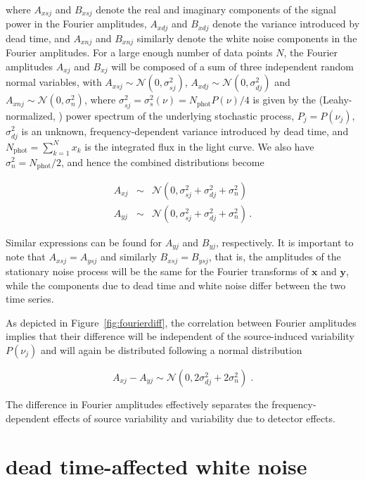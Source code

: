 \documentclass[twocolumn]{aastex61}
\newcommand{\Normal}{\ensuremath{{\mathcal N}}}
\begin{document}
\noindent where $A_{xsj}$ and $B_{xsj}$ denote the real and imaginary components of the signal power in the Fourier amplitudes,  $A_{xdj}$ and $B_{xdj}$ denote the variance introduced by dead time, and $A_{xnj}$ and $B_{xnj}$ similarly denote the white noise components in the Fourier amplitudes.
For a large enough number of data points $N$, the Fourier amplitudes $A_{xj}$ and $B_{xj}$ will be composed of a sum of three independent random normal variables, with $A_{xsj} \sim \Normal(0, \sigma_{sj}^2)$,  $A_{xdj} \sim \Normal(0, \sigma_{dj}^2)$ and $A_{xnj} \sim \Normal(0, \sigma_n^2)$, where $\sigma_{sj}^2 = \sigma_{s}^2(\nu) = N_\mathrm{phot}P(\nu)/4$ is given by the (Leahy-normalized, \citealt{Leahy+83}) power spectrum of the underlying stochastic process, $P_j = P(\nu_j)$, $\sigma_{dj}^2$ is an unknown, frequency-dependent variance introduced by dead time, and $N_{\mathrm{phot}} = \sum_{k=1}^{N}{x_k}$ is the integrated flux in the light curve. We also have $\sigma_n^2 = N_\mathrm{phot}/2$, and hence the combined distributions become

\begin{eqnarray}
A_{xj} &\sim & \Normal(0, \sigma_{sj}^2 + \sigma_{dj}^2 + \sigma_{n}^2) \nonumber \\
A_{yj} &\sim & \Normal(0, \sigma_{sj}^2 + \sigma_{dj}^2 + \sigma_{n}^2) \nonumber \, .
\end{eqnarray}

\noindent Similar expressions can be found for $A_{yj}$ and $B_{yj}$, respectively. It is important to note that $A_{xsj} = A_{ysj}$ and similarly $B_{xsj} = B_{ysj}$, that is, the amplitudes of the stationary noise process will be the same for the Fourier transforms of $\mathbf{x}$ and $\mathbf{y}$, while the components due to dead time and white noise differ between the two time series.

As depicted in Figure~\ref{fig:fourierdiff}, the correlation between Fourier amplitudes implies that their difference will be independent of the source-induced variability $P(\nu_j)$ and will again be distributed following a normal distribution 

\[
A_{xj} - A_{yj} \sim \Normal(0, 2\sigma_{dj}^2 + 2\sigma_{n}^2) \; .
\]

\noindent The difference in Fourier amplitudes effectively separates the frequency-dependent effects of source variability and variability due to detector effects.
 
\section{dead time-affected white noise} \label{sec:wndeadtime}
\end{document}
